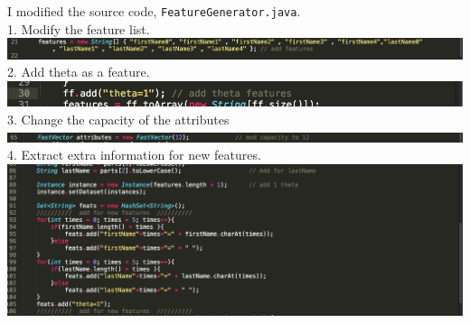I modified the source code, \texttt{FeatureGenerator.java}.\\
1. Modify the feature list.\\
\includegraphics[scale = 0.28]{1.png}\\
2. Add theta as a feature.\\
\includegraphics[scale = 0.28]{2.png}\\
3. Change the capacity of the attributes\\
\includegraphics[scale = 0.28]{3.png}\\
4. Extract extra information for new features.\\
\includegraphics[scale = 0.28]{4.png}\\